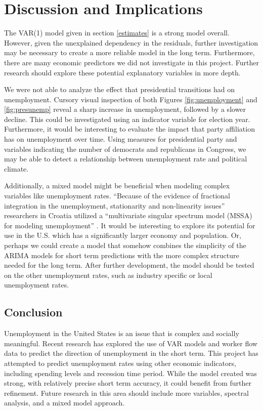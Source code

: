 \documentclass[twoside,twocolumn]{article}
\begin{document}
\section{Discussion and Implications}

The VAR(1) model given in section \ref{estimates} is a strong model overall. However, given the unexplained dependency in the residuals, further investigation may be necessary to create a more reliable model in the long term. Furthermore, there are many economic predictors we did not investigate in this project. Further research should explore these potential explanatory variables in more depth.

We were not able to analyze the effect that presidential transitions had on unemployment.  Cursory visual inspection of both Figures \ref{fig:unemployment} and \ref{fig:presunemp} reveal a sharp increase in unemployment, followed by a slower decline.   This could be investigated using an indicator variable for election year.  Furthermore, it would be interesting to evaluate the impact that party affiliation has on unemployment over time.  Using measures for presidential party and variables indicating the number of democrats and republicans in Congress, we may be able to detect a relationship between unemployment rate and political climate.

Additionally, a mixed model might be beneficial when modeling complex variables like unemployment rates.  ``Because of the evidence of fractional integration in the unemployment, stationarity and non-linearity issues'' researchers in Croatia utilized a ``multivariate singular spectrum model (MSSA) for modeling unemployment'' \citep{Skare2015}. It would be interesting to explore its potential for use in the U.S. which has a significantly larger economy and population.  Or, perhaps we could create a model that somehow combines the simplicity of the ARIMA models for short term predictions with the more complex structure needed for the long term. After further development, the model should be tested on the other unemployment rates, such as industry specific or local unemployment rates.

\subsection{Conclusion}

Unemployment in the United States is an issue that is complex and socially meaningful. Recent research has explored the use of VAR models and worker flow data to predict the direction of unemployment in the short term. This project has attempted to predict unemployment rates using other economic indicators, including spending levels and recession time period. While the model created was strong, with relatively precise short term accuracy, it could benefit from further refinement. Future research in this area should include more variables, spectral analysis, and a mixed model approach.
\end{document}
